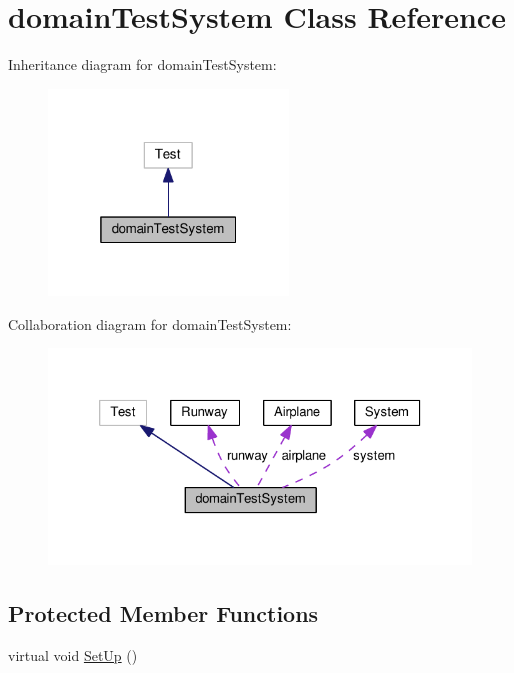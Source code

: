 \hypertarget{classdomainTestSystem}{}\section{domain\+Test\+System Class Reference}
\label{classdomainTestSystem}


Inheritance diagram for domain\+Test\+System\+:
\nopagebreak
\begin{figure}[H]
\begin{center}
\leavevmode
\includegraphics[width=181pt]{classdomainTestSystem__inherit__graph}
\end{center}
\end{figure}


Collaboration diagram for domain\+Test\+System\+:
\nopagebreak
\begin{figure}[H]
\begin{center}
\leavevmode
\includegraphics[width=326pt]{classdomainTestSystem__coll__graph}
\end{center}
\end{figure}
\subsection*{Protected Member Functions}
\begin{DoxyCompactItemize}
\item 
virtual void \hyperlink{classdomainTestSystem_a66847562361560bb020f4c9b19d009eb}{Set\+Up} ()
\end{DoxyCompactItemize}
